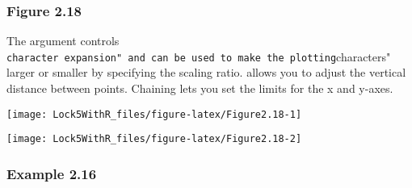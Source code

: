 \documentclass[]{book}
\newenvironment{Shaded}{\begin{snugshade}}{\end{snugshade}}
\newcommand{\DataTypeTok}[1]{\textcolor[rgb]{0.13,0.29,0.53}{#1}}
\newcommand{\DecValTok}[1]{\textcolor[rgb]{0.00,0.00,0.81}{#1}}
\newcommand{\FloatTok}[1]{\textcolor[rgb]{0.00,0.00,0.81}{#1}}
\newcommand{\KeywordTok}[1]{\textcolor[rgb]{0.13,0.29,0.53}{\textbf{#1}}}
\newcommand{\NormalTok}[1]{#1}
\newcommand{\OperatorTok}[1]{\textcolor[rgb]{0.81,0.36,0.00}{\textbf{#1}}}
\newcommand{\StringTok}[1]{\textcolor[rgb]{0.31,0.60,0.02}{#1}}
\begin{document}
\hypertarget{figure-2.18}{%
\subsubsection{Figure 2.18}\label{figure-2.18}}

The  argument controls \texttt{character\ expansion"\ and\ can\ be\ used\ to\ make\ the\ plotting}characters" larger or smaller by specifying the scaling ratio.  allows you to adjust the vertical distance between points. Chaining  lets you set the limits for the x and y-axes.

\begin{Shaded}
\end{Shaded}

\texttt{[image: Lock5WithR\_files/figure-latex/Figure2.18-1]}

\begin{Shaded}
\end{Shaded}

\texttt{[image: Lock5WithR\_files/figure-latex/Figure2.18-2]}

\hypertarget{example-2.16}{%
\subsubsection{Example 2.16}\label{example-2.16}}
\end{document}
